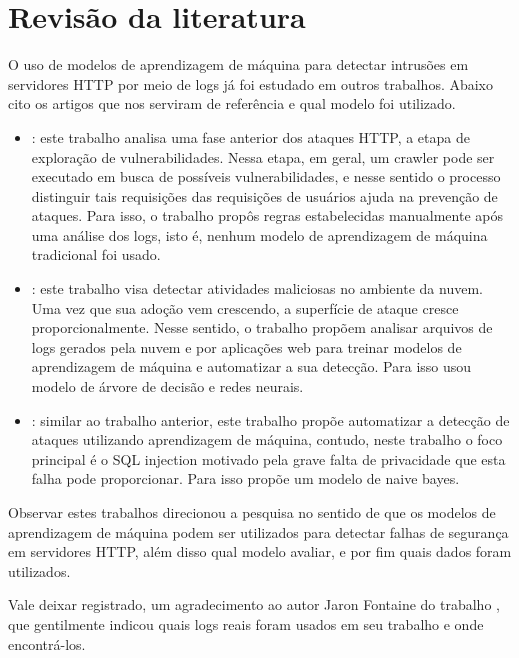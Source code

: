 
\chapter{Revisão da literatura}
\label{cap:fundamentation}

O uso de modelos de aprendizagem de máquina para detectar intrusões em servidores HTTP 
por meio de logs já foi estudado em outros trabalhos. Abaixo cito os artigos que nos
serviram de referência e qual modelo foi utilizado.

\begin{itemize}
    \item \cite{ref:art3}: este trabalho analisa uma fase anterior dos ataques HTTP, a etapa
    de exploração de vulnerabilidades. Nessa etapa, em geral, um crawler pode ser executado 
    em busca de possíveis vulnerabilidades, e nesse sentido o processo distinguir tais 
    requisições das requisições de usuários ajuda na prevenção de ataques. Para isso, o 
    trabalho propôs regras estabelecidas manualmente após uma análise dos logs, isto é, 
    nenhum modelo de aprendizagem de máquina tradicional foi usado.

    \item \cite{ref:art6}: este trabalho visa detectar atividades maliciosas no ambiente 
    da nuvem. Uma vez que sua adoção vem crescendo, a superfície de ataque cresce proporcionalmente.
    Nesse sentido, o trabalho propõem analisar arquivos de logs gerados pela nuvem e por aplicações
    web para treinar modelos de aprendizagem de máquina e automatizar a sua detecção. Para isso
    usou modelo de árvore de decisão e redes neurais.

    \item \cite{ref:art2}: similar ao trabalho anterior, este trabalho propõe automatizar
    a detecção de ataques utilizando aprendizagem de máquina, contudo, neste trabalho
    o foco principal é o SQL injection motivado pela grave falta de privacidade 
    que esta falha pode proporcionar. Para isso propõe um modelo de naive bayes.
\end{itemize}

Observar estes trabalhos direcionou a pesquisa no sentido de que os modelos de 
aprendizagem de máquina podem ser utilizados para detectar falhas de segurança
em servidores HTTP, além disso qual modelo avaliar, e por fim quais dados foram utilizados.

Vale deixar registrado, um agradecimento ao autor Jaron Fontaine do trabalho \cite{ref:art6}, que gentilmente
indicou quais logs reais foram usados em seu trabalho e onde encontrá-los.